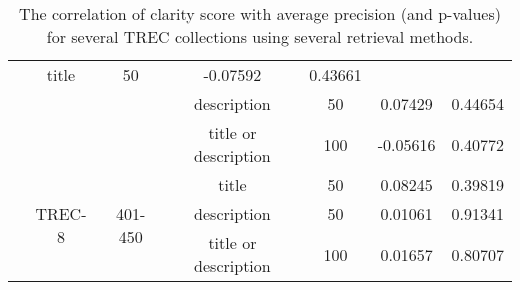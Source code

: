 \begin{table*}[hbt!]
\begin{tabular}{| c || c | c | c | c || c | c |}
            &   title & 50 & -0.07592 & 0.43661\\
    &   &   &   description & 50 & 0.07429 & 0.44654\\
    &   &   &   title or description & 100 & -0.05616 & 0.40772\\
    \cline{2-7}
    &   \multirow{3}{*}{TREC-8}
        &   \multirow{3}{*}{401-450}
            &   title & 50 & 0.08245 & 0.39819\\
    &   &   &   description & 50 & 0.01061 & 0.91341\\
    &   &   &   title or description & 100 & 0.01657 & 0.80707\\
    \hline
  \end{tabular}
  \caption{The correlation of clarity score with average precision (and p-values) for several TREC collections  using several retrieval methods.}
  \label{table:collections}
\end{table*}
